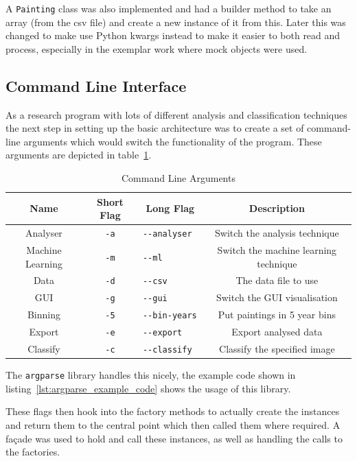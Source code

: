 A \texttt{Painting} class was also implemented and had a builder method to take an array (from the
\gls{csv} file) and create a new instance of it from this. Later this was changed to make use 
Python \gls{kwargs} instead to make it easier to both read and process, especially in the exemplar
work where mock objects were used.


\subsection{Command Line Interface}
As a research program with lots of different analysis and classification techniques the next step
in setting up the basic architecture was to create a set of command-line arguments which would
switch the functionality of the program. These arguments are depicted in table~\ref{tab:args}.

\begin{table}[h]
\centering
\begin{tabular}{|c|c|c|c|} \hline
Name             & Short Flag & Long Flag         & Description\\\hline
Analyser         & \verb+-a+  & \verb+--analyser  +& Switch the analysis technique\\
Machine Learning & \verb+-m+  & \verb+--ml        +& Switch the machine learning technique\\
Data             & \verb+-d+  & \verb+--csv       +& The data file to use\\
GUI              & \verb+-g+  & \verb+--gui       +& Switch the GUI visualisation\\
Binning          & \verb+-5+  & \verb+--bin-years +& Put paintings in 5 year bins\\
Export           & \verb+-e+  & \verb+--export    +& Export analysed data\\
Classify         & \verb+-c+  & \verb+--classify  +& Classify the specified image\\
\hline
\end{tabular}
\caption{Command Line Arguments}\label{tab:args}
\end{table}

The \texttt{argparse} library handles this nicely, the example code shown in 
listing~\ref{lst:argparse_example_code} shows the usage of this library.

These flags then hook into the factory methods to actually create the instances and return them to
the central point which then called them where required. A 
fa\c{c}ade\cite[p.185-194]{Gamma1996Design} was used to hold and call these instances, as well as
handling the calls to the factories.


